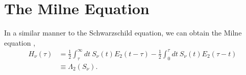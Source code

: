 \newslide

\section{The Milne Equation}

In a similar manner to the Schwarzschild equation, we can obtain the
Milne equation \cite[p.\ 130]{Milne-1930},
\begin{align}
H_\nu(\tau) &= 
 \frac{1}{2}\int_{\tau}^\infty\!\!\!dt\: S_\nu(t) E_2(t - \tau)
 - 
\frac{1}{2} \int_0^{\tau}\!dt\: S_\nu(t) E_2(\tau - t)\\
&\equiv \Lambda_2(S_\nu).
\end{align}
